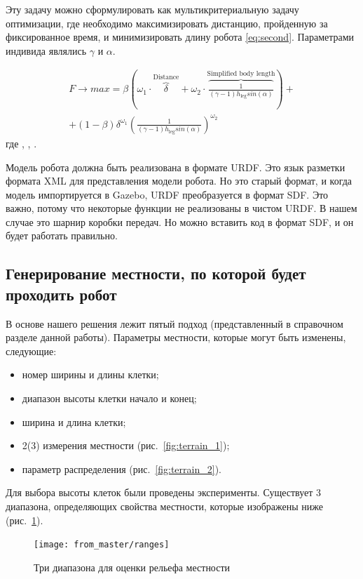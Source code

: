 Эту задачу можно сформулировать как мультикритериальную задачу оптимизации, где необходимо максимизировать дистанцию, пройденную за фиксированное время, и минимизировать длину робота \eqref{eq:second}. Параметрами индивида являлись $\gamma$ и $\alpha$.

\begin{align}
    \label{eq:second}
    F \rightarrow max = \beta \left( {\omega}_{1} \cdot \overbrace{\delta}^{\text{Distance}} + {\omega}_{2} \cdot \overbrace{\frac{1}{(\gamma - 1) h_{\text{leg}}sin(\alpha)}}^{\text{Simplified body length}}\right) + \\ \nonumber + (1 - \beta) {\delta}^{{\omega}_{1}} {\left( \frac{1}{(\gamma - 1)h_{\text{leg}}sin(\alpha)}\right)}^{{\omega}_{2}}
\end{align}
где , , .


Модель робота должна быть реализована в формате URDF. Это язык разметки формата XML для представления модели робота. Но это старый формат, и когда модель импортируется в Gazebo, URDF преобразуется в формат SDF. Это важно, потому что некоторые функции не реализованы в чистом URDF. В нашем случае это шарнир коробки передач. Но можно вставить код в формат SDF, и он будет работать правильно.

\subsection{Генерирование местности, по которой будет проходить робот}
В основе нашего решения лежит пятый подход (представленный в справочном разделе данной работы).
Параметры местности, которые могут быть изменены, следующие:
\begin{itemize}
\item номер ширины и длины клетки;
\item диапазон высоты клетки начало и конец;
\item ширина и длина клетки;
\item 2(3) измерения местности (рис.~\ref{fig:terrain_1});
\item параметр распределения (рис.~\ref{fig:terrain_2}).
\end{itemize}

Для выбора высоты клеток были проведены эксперименты.
Существует 3 диапазона, определяющих свойства местности, которые изображены ниже (рис.~\ref{fig:range}).

\begin{figure}[H]
\centering\texttt{[image: from\_master/ranges]}\\
\caption{Три диапазона для оценки рельефа местности}
\label{fig:range}
\end{figure}

